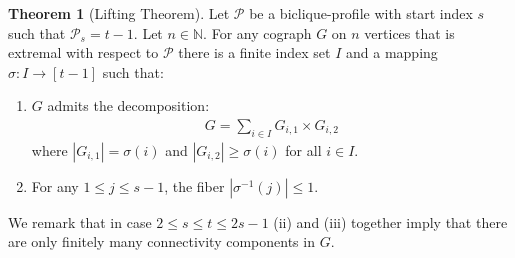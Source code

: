 \documentclass{article}
\newcommand{\NN}{\mathbb{N}}
\theoremstyle{definition}
\newtheorem{Theorem}{Theorem}
\theoremstyle{definition}
\theoremstyle{definition}
\theoremstyle{definition}
\theoremstyle{definition}
\theoremstyle{definition}
\theoremstyle{definition}
\theoremstyle{definition}
\theoremstyle{definition}
\theoremstyle{definition}
\begin{document}
\begin{Theorem}[Lifting Theorem] \label{thm:lifting}
    Let $\mathscr{P}$ be a biclique-profile with start index $s$ such that $\mathscr{P}_s = t-1$. Let $n \in \NN$. For any cograph $G$ on $n$ vertices that is extremal with respect to $\mathscr{P}$ there is a finite index set $I$ and a mapping $\sigma: I \to [t-1]$ such that:
    \begin{enumerate}[label=(\roman*)]
        \item $G$ admits the decomposition:
        \begin{align}
            G = \sum_{i \in I} G_{i,1} \times G_{i,2}
        \end{align}
        where $|G_{i,1}| = \sigma(i)$ and $|G_{i,2}| \geq \sigma(i)$ for all $i \in I$.
        \item For any $1 \leq j \leq s-1$, the fiber $|\sigma^{-1}(j)| \leq 1$.
    \end{enumerate}

    We remark that in case $2 \leq s  \leq t \leq 2s - 1$ (ii) and (iii) together imply that there are only finitely many connectivity components in $G$.
\end{Theorem}
\end{document}
